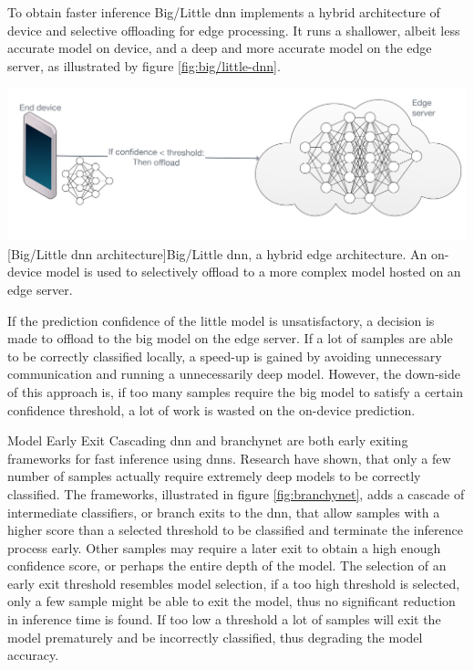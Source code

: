 \begin{enumdescript}
	To obtain faster inference Big/Little \gls{dnn} \cite{park_big/little_2015} implements a hybrid architecture of device and selective offloading for edge processing. It runs a shallower, albeit less accurate model on device, and a deep and more accurate model on the edge server, as illustrated by figure \ref{fig:big/little-dnn}. 
	
	\begin{minipage}[t]{\linewidth}    
		\centering                          
		\includegraphics[width=.8\linewidth]{figures/models/big_little_dnn}
		[Big/Little \gls{dnn} architecture]{Big/Little \gls{dnn}, a hybrid edge architecture. An on-device model is used to selectively offload to a more complex model hosted on an edge server.}
		\label{fig:big/little-dnn}
	\end{minipage}
	
	If the prediction confidence of the little model is unsatisfactory, a decision is made to offload to the big model on the edge server. If a lot of samples are able to be correctly classified locally, a speed-up is gained by avoiding unnecessary communication and running a unnecessarily deep model. However, the down-side of this approach is, if too many samples require the big model to satisfy a certain confidence threshold, a lot of work is wasted on the on-device prediction. 
	
	\item[Model Early Exit] Cascading \gls{dnn} \cite{leroux_resource-constrained_2015} and \gls{branchynet} \cite{teerapittayanon_branchynet:_2016} are both early exiting frameworks for fast inference using \gls{dnn}s. Research have shown, that only a few number of samples actually require extremely deep models to be correctly classified. The frameworks, illustrated in figure \ref{fig:branchynet}, adds a cascade of intermediate classifiers, or branch exits to the \gls{dnn}, that allow samples with a higher score than a selected threshold to be classified and terminate the inference process early. Other samples may require a later exit to obtain a high enough confidence score, or perhaps the entire depth of the model. The selection of an early exit threshold resembles model selection, if a too high threshold is selected, only a few sample might be able to exit the model, thus no significant reduction in inference time is found. If too low a threshold a lot of samples will exit the model prematurely and be incorrectly classified, thus degrading the model accuracy. 


\end{enumdescript}
